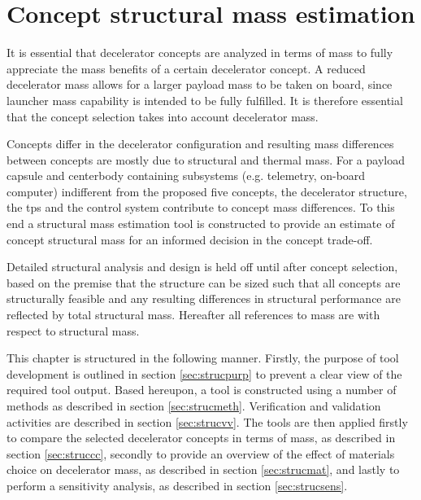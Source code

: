 \section{Concept structural mass estimation} \label{ch:strucmass}
It is essential that decelerator concepts are analyzed in terms of mass to fully appreciate the mass benefits of a certain decelerator concept. A reduced decelerator mass allows for a larger payload mass to be taken on board, since launcher mass capability is intended to be fully fulfilled. It is therefore essential that the concept selection takes into account decelerator mass. 

Concepts differ in the decelerator configuration and resulting mass differences between concepts are mostly due to structural and thermal mass. For a payload capsule and centerbody containing subsystems (e.g. telemetry, on-board computer) indifferent from the proposed five concepts, the decelerator structure, the \acrfull{tps} and the control system contribute to concept mass differences. To this end a structural mass estimation tool is constructed to provide an estimate of concept structural mass for an informed decision in the concept trade-off. 

Detailed structural analysis and design is held off until after concept selection, based on the premise that the structure can be sized such that all concepts are structurally feasible and any resulting differences in structural performance are reflected by total structural mass. Hereafter all references to mass are with respect to structural mass.

This chapter is structured in the following manner. Firstly, the purpose of tool development is outlined in section \ref{sec:strucpurp} to prevent a clear view of the required tool output. Based hereupon, a tool is constructed using a number of methods as described in section \ref{sec:strucmeth}. Verification and validation activities are described in section \ref{sec:strucvv}. The tools are then applied firstly to compare the selected decelerator concepts in terms of mass, as described in section \ref{sec:struccc}, secondly to provide an overview of the effect of materials choice on decelerator mass, as described in section \ref{sec:strucmat}, and lastly to perform a sensitivity analysis, as described in section \ref{sec:strucsens}.

